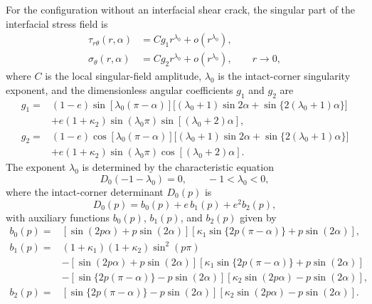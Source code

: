 \documentclass[pdflatex,onecolumn,sn-mathphys-ay]{sn-jnl}
\begin{document}
For the configuration without an interfacial shear crack, the singular
part of the interfacial stress field is~\citep{NazarenkoKipnis2022Stress}
\begin{equation}
\label{eq:app-intact-field}
\begin{aligned}
  \tau_{r\theta}(r,\alpha)
    &=Cg_1r^{\lambda_0}+o\!\left(r^{\lambda_0}\right),\\
  \sigma_\theta(r,\alpha)
    &=Cg_2r^{\lambda_0}+o\!\left(r^{\lambda_0}\right),
    \qquad r\to0,
\end{aligned}
\end{equation}
where $C$ is the local singular-field amplitude, $\lambda_0$ is
the intact-corner singularity exponent, and the dimensionless angular
coefficients $g_1$ and $g_2$ are
\begin{equation*}
\begin{aligned}
  g_1={}&(1-e)\sin[\lambda_0(\pi-\alpha)]
  \bigl[(\lambda_0+1)\sin2\alpha
       +\sin\{2(\lambda_0+1)\alpha\}\bigr]\\
  &+e(1+\kappa_2)\sin(\lambda_0\pi)
      \sin[(\lambda_0+2)\alpha],\\[2pt]
  g_2={}&(1-e)\cos[\lambda_0(\pi-\alpha)]
  \bigl[(\lambda_0+1)\sin2\alpha
       +\sin\{2(\lambda_0+1)\alpha\}\bigr]\\
  &+e(1+\kappa_2)\sin(\lambda_0\pi)
      \cos[(\lambda_0+2)\alpha].
\end{aligned}
\end{equation*}
The exponent $\lambda_0$ is determined by the characteristic equation
\begin{equation}
\label{eq:app-D0-root}
  D_0(-1-\lambda_0)=0,
  \qquad -1<\lambda_0<0,
\end{equation}
where the intact-corner determinant $D_0(p)$ is
\begin{equation*}
  D_0(p)=b_0(p)+e\,b_1(p)+e^2b_2(p),
\end{equation*}
with auxiliary functions $b_0(p)$, $b_1(p)$, and $b_2(p)$ given by
\begin{equation*}
\begin{aligned}
  b_0(p)={}&
  [\sin(2p\alpha)+p\sin(2\alpha)]
  [\kappa_1\sin\{2p(\pi-\alpha)\}+p\sin(2\alpha)],\\[2pt]
  b_1(p)={}&(1+\kappa_1)(1+\kappa_2)\sin^2(p\pi)\\
  &-[\sin(2p\alpha)+p\sin(2\alpha)]
    [\kappa_1\sin\{2p(\pi-\alpha)\}+p\sin(2\alpha)]\\
  &-[\sin\{2p(\pi-\alpha)\}-p\sin(2\alpha)]
    [\kappa_2\sin(2p\alpha)-p\sin(2\alpha)],\\[2pt]
  b_2(p)={}&
  [\sin\{2p(\pi-\alpha)\}-p\sin(2\alpha)]
  [\kappa_2\sin(2p\alpha)-p\sin(2\alpha)].
\end{aligned}
\end{equation*}
\end{document}
